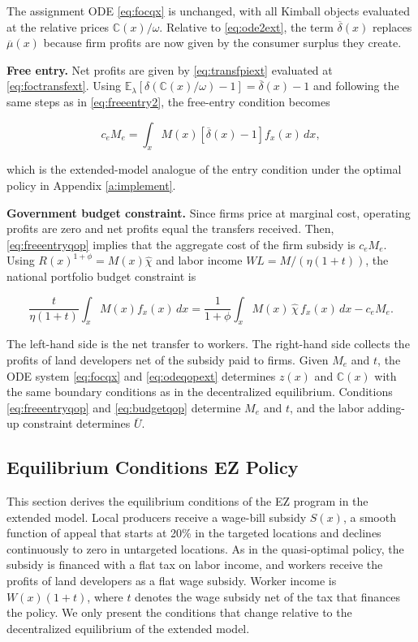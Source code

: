 The assignment ODE \eqref{eq:focqx} is unchanged, with all Kimball objects evaluated at the relative prices $\mathbb{C}(x)/\omega$. Relative to \eqref{eq:ode2ext}, the term $\overline{\delta}(x)$ replaces $\overline{\mu}(x)$ because firm profits are now given by the consumer surplus they create.

\textbf{Free entry.} Net profits are given by \eqref{eq:transfpiext} evaluated at \eqref{eq:foctransfext}. Using $\mathbb{E}_\lambda\left[\delta\left(\mathbb{C}(x)/\omega\right) - 1\right] = \overline{\delta}(x) - 1$ and following the same steps as in \eqref{eq:freeentry2}, the free-entry condition becomes

\begin{equation}\label{eq:freeentryqop}
	c_e M_e = \int_x M(x) \left[\overline{\delta}(x) - 1\right] f_x(x)\, dx,
\end{equation}

which is the extended-model analogue of the entry condition under the optimal policy in Appendix \ref{a:implement}.

\textbf{Government budget constraint.} Since firms price at marginal cost, operating profits are zero and net profits equal the transfers received. Then, \eqref{eq:freeentryqop} implies that the aggregate cost of the firm subsidy is $c_e M_e$. Using $R(x)^{1+\phi} = M(x)\widehat{\chi}$ and labor income $WL = M/(\eta(1+t))$, the national portfolio budget constraint is

\begin{equation}\label{eq:budgetqop}
	\frac{t}{\eta(1+t)} \int_x M(x) f_x(x)\, dx = \frac{1}{1+\phi} \int_x M(x)\, \widehat{\chi}\, f_x(x)\, dx - c_e M_e.
\end{equation}

The left-hand side is the net transfer to workers. The right-hand side collects the profits of land developers net of the subsidy paid to firms. Given $M_e$ and $t$, the ODE system \eqref{eq:focqx} and \eqref{eq:odeqopext} determines $z(x)$ and $\mathbb{C}(x)$ with the same boundary conditions as in the decentralized equilibrium. Conditions \eqref{eq:freeentryqop} and \eqref{eq:budgetqop} determine $M_e$ and $t$, and the labor adding-up constraint determines $\overline{U}$.

\subsection{Equilibrium Conditions EZ Policy}\label{a:ezext}
This section derives the equilibrium conditions of the EZ program in the extended model. Local producers receive a wage-bill subsidy $S(x)$, a smooth function of appeal that starts at 20\% in the targeted locations and declines continuously to zero in untargeted locations. As in the quasi-optimal policy, the subsidy is financed with a flat tax on labor income, and workers receive the profits of land developers as a flat wage subsidy. Worker income is $W(x)(1+t)$, where $t$ denotes the wage subsidy net of the tax that finances the policy. We only present the conditions that change relative to the decentralized equilibrium of the extended model.

